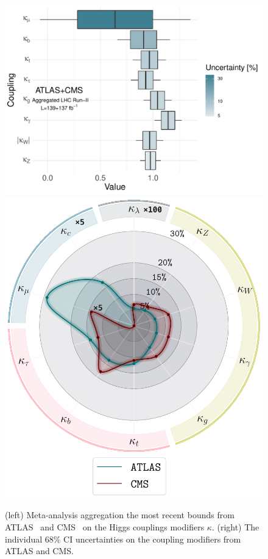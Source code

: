 \begin{figure}[htb!]
	\begin{center}
		\includegraphics[height=0.3\textheight]{figures/agg_higgs_couplings}
		\includegraphics[height=0.3\textheight]{figures/Higgs_couplings_poster}
		\caption{(left) Meta-analysis aggregation the most recent bounds from ATLAS~\cite{ATLAS2021vrm} and CMS~\cite{CMS:2020gsy} on the Higgs couplings modifiers $\kappa$. (right) The individual 68\% CI uncertainties on the coupling modifiers from ATLAS and CMS.   }	
		\label{fig:couplings-bound}
	\end{center}
\end{figure}
